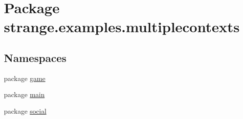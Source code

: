 \hypertarget{namespacestrange_1_1examples_1_1multiplecontexts}{\section{Package strange.\-examples.\-multiplecontexts}
\label{namespacestrange_1_1examples_1_1multiplecontexts}
}
\subsection*{Namespaces}
\begin{DoxyCompactItemize}
\item 
package \hyperlink{namespacestrange_1_1examples_1_1multiplecontexts_1_1game}{game}
\item 
package \hyperlink{namespacestrange_1_1examples_1_1multiplecontexts_1_1main}{main}
\item 
package \hyperlink{namespacestrange_1_1examples_1_1multiplecontexts_1_1social}{social}
\end{DoxyCompactItemize}

